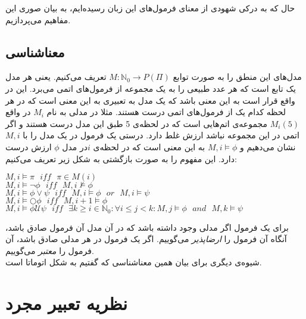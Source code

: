 حال که به درکی شهودی از معنای فرمول‌های این زبان رسیده‌ایم، به بیان صوری این مفاهیم می‌پردازیم.

\subsection{معناشناسی }

مدل‌های این منطق را به صورت توابع
$M:\mathbb{N}_0 \rightarrow \mathit{P}(\Pi)$ 
تعریف می‌کنیم. یعنی هر مدل یک تابع است که هر عدد طبیعی را به یک مجموعه از فرمول‌های اتمی می‌برد. این در واقع قرار است به این معنی باشد که یک مدل به تعبیری به این معنی است که در هر لحظه کدام یک از فرمول‌های اتمی درست هستند. مثلا در مدلی به نام $M_i$ در واقع
$M_i(5)$
مجموعه‌ی اتم‌هایی است که در لحظه‌ی 5 طبق این مدل درست هستند و اگر اتمی در این مجموعه نباشد ارزش غلط دارد.
درستی یک فرمول در یک مدل را با 
$M,i$
نشان می‌دهیم و 
$M,i \models \phi$
به این معنی است که در لحظه‌ی $i$در مدل $\phi$ ارزش درست دارد. این مفهوم را به صورت بازگشتی به شکل زیر تعریف می‌کنیم:


\begin{flushleft}
$	M,i \models \pi \:\:\: \mathit{iff} \:\:\: \pi \in M(i)$\\
$	M,i \models \neg \phi \:\:\: \mathit{iff} \:\:\: M,i\nvDash \phi$\\
$	M,i \models \phi \lor \psi \:\:\: \mathit{iff} \:\:\: M,i \models \phi \:\:\: \mathit{or} \:\:\: M,i \models \psi$\\
	 $M,i \models \bigcirc \phi  \:\:\:  \mathit{iff} \:\:\: M,i+1 \models \phi$\\
	 $M,i \models \phi \mathcal{U} \psi \:\:\: \mathit{iff} \:\:\: 
	 \exists k \geq i \in \mathbb{N}_0: \forall i\leq j< k: M,j \models \phi \:\:\: \mathit{and} \:\:\: M,k \models \psi$
\end{flushleft}

برای یک فرمول اگر مدلی وجود داشته باشد که در آن مدل آن فرمول صادق باشد، آنگاه آن فرمول را \emph{ارضاپذیر} می‌گوییم. اگر یک فرمول در هر مدلی صادق باشد، آن فرمول را \emph{معتبر} می‌گوییم.\\
شیوه‌ی دیگری برای بیان همین معناشناسی که گفتیم به شکل اتوماتا است. 


\section{نظریه تعبیر مجرد}


